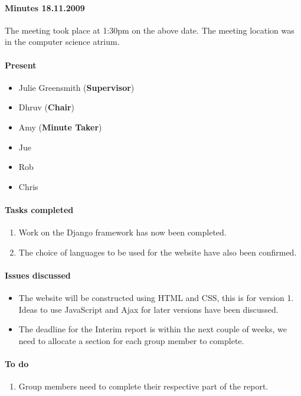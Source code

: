 \paragraph{Minutes 18.11.2009}  
The meeting took place at 1:30pm on the above date. The meeting location was in the computer science atrium. 

\paragraph{Present}

\begin{itemize}
	\item Julie Greensmith (\textbf{Supervisor})
	\item Dhruv (\textbf{Chair})
	\item Amy (\textbf{Minute Taker})
	\item Jue
	\item Rob
	\item Chris 
	
\end{itemize}

\paragraph{Tasks completed}

\begin{enumerate}
	\item Work on the Django framework has now been completed.
	\item The choice of languages to be used for the website have also been confirmed. 
\end{enumerate}

\paragraph{Issues discussed}

\begin{itemize}
	\item The website will be constructed using HTML and CSS, this is for version 1. Ideas to use JavaScript and Ajax for later versions have been discussed. 
	\item The deadline for the Interim report is within the next couple of weeks, we need to allocate a section for each group member to complete. 
	
\end{itemize}

\paragraph{To do}

\begin{enumerate}
	\item Group members need to complete their respective part of the report. 
\end{enumerate}

